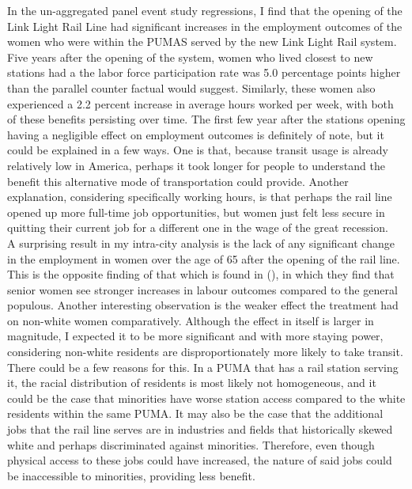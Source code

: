 \documentclass[A4paper,12pt]{article}
\begin{document}
In the un-aggregated panel event study regressions, I find that the opening of the Link Light Rail Line had significant increases in the employment outcomes of the women who were within the PUMAS served by the new Link Light Rail system. Five years after the opening of the system, women who lived closest to new stations had a  the labor force participation rate was 5.0 percentage points higher than the parallel counter factual would suggest. Similarly, these women also experienced a 2.2 percent increase in average hours worked per week, with both of these benefits persisting over time. The first few year after the stations opening having a negligible effect on employment outcomes is definitely of note, but it could be explained in a few ways. One is that, because transit usage is already relatively low in America, perhaps it took longer for people to understand the benefit this alternative mode of transportation could provide. Another explanation, considering specifically working hours, is that perhaps the rail line opened up more full-time job opportunities, but women just felt less secure in quitting their current job for a different one in the wage of the great recession. \\

A surprising result in my intra-city analysis is the lack of any significant change in the employment in women over the age of 65 after the opening of the rail line. This is the opposite finding of that which is found in \citeauthor{kim_subways_2019} (\citeyear{kim_subways_2019}), in which they find that senior women see stronger increases in labour outcomes compared to the general populous. Another interesting observation is the weaker effect the treatment had on non-white women comparatively. Although the effect in itself is larger in magnitude, I expected it to be more significant and with more staying power, considering non-white residents are disproportionately more likely to take transit. There could be a few reasons for this. In a PUMA that has a rail station serving it, the racial distribution of residents is most likely not homogeneous, and it could be the case that minorities have worse station access compared to the white residents within the same PUMA. It may also be the case that the additional jobs that the rail line serves are in industries and fields that historically skewed white and perhaps discriminated against minorities. Therefore, even though physical access to these jobs could have increased, the nature of said jobs could be inaccessible to minorities, providing less benefit. \\
\end{document}
